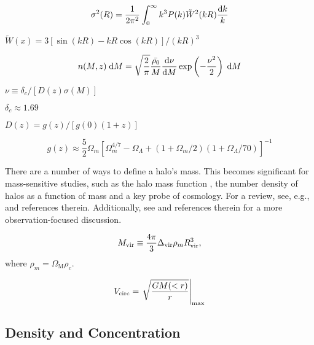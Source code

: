 \begin{equation}
	\sigma^{2}(R) = \frac{1}{2 \pi^{2}} \int_{0}^{\infty} k^{3} P(k) \tilde{W}^{2}(k R) \frac{{\rm {d}} k}{k}
\end{equation}

$\tilde{W}(x) = 3 [ \sin( k R ) - k R \cos( k R ) ] / ( k R )^{3}$

\begin{equation}
	n(M, z) {\; \rm {d}} M = \sqrt{\frac{2}{\pi}} \frac{\bar{\rho_{0}}}{M} \frac{{\rm {d}} \nu}{{\rm {d}} M} \exp\left( -\frac{\nu^{2}}{2}\right) {\; \rm {d}} M
\end{equation}

$\nu \equiv \delta_{c} / [D(z) \sigma(M)]$

$\delta_{c} \approx 1.69$

$D(z) = g(z) / [g(0) (1 + z)]$

\begin{equation}
	g(z) \approx \frac{5}{2} \Omega_{m} \left[ \Omega_{m}^{4/7} - \Omega_{\Lambda} + (1 + \Omega_{m} / 2) (1 + \Omega_{\Lambda} / 70) \right]^{-1}
\end{equation}

There are a number of ways to define a halo's mass.  This becomes significant for mass-sensitive studies, such as the halo mass function \citep{1974ApJ...187..425P, 2007MNRAS.374....2R, 2006ApJ...642L..85H, 2007ApJ...671.1160L}, the number density of halos as a function of mass and a key probe of cosmology.  For a review, see, e.g., \citet{2001A&A...367...27W} and references therein.  Additionally, see \citet{2005RvMP...77..207V} and references therein for a more observation-focused discussion.

\begin{equation}
	{M_{\mathrm{vir}}} \equiv \frac{4 \pi}{3} \Delta_{{\mathrm{vir}}} \rho_{m} R^{3}_{{\mathrm{vir}}},
\end{equation}
where $\rho_{m} = \Omega_{\mathrm{M}} \rho_{c}$.

\begin{equation}
	{V_{\mathrm{circ}}} = \left. \sqrt{\frac{GM(<r)}{r}} \right|_{\mathrm{\max}}
\end{equation}




\subsection{Density and Concentration}
\label{subsec:early_universe--dark_matter_halos--density}


